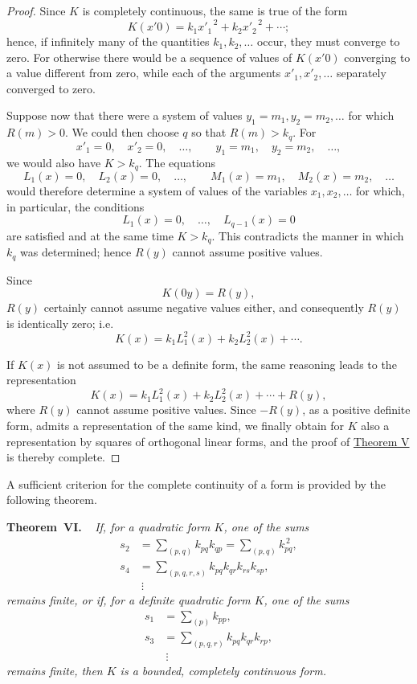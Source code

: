 \documentclass[b5paper,twoside]{article}
\makeatletter
\newcommand{\hilbertstatementname}[2]{%
  \textbf{#1\if\relax\detokenize{#2}\relax\else\ #2\fi.}%
}
\newenvironment{theorem}[1][]{%
  \par\addvspace{.7\baselineskip}%
  \phantomsection
  \protected@edef\@currentlabel{#1}%
  \noindent\hilbertstatementname{Theorem}{#1}\ \itshape\ignorespaces
}{%
  \par\addvspace{.7\baselineskip}%
}
\newcommand{\originalpage}[1]{\phantomsection\label{origpage:#1}}
\makeatother
\begin{document}
\begin{proof}
Since $K$ is completely continuous, the same is true of the form
\[
  K(x'0)=k_1{x'_1}^{\,2}+k_2{x'_2}^{\,2}+\cdots;
\]
hence, if infinitely many of the quantities $k_1,k_2,\ldots$ occur, they must
converge to zero.  For otherwise there would be a sequence of values of
$K(x'0)$ converging to a value different from zero, while each of the
arguments $x'_1,x'_2,\ldots$ separately converged to zero.

Suppose now that there were a system of values
$y_1=m_1,y_2=m_2,\ldots$ for which $R(m)>0$.  We could then choose $q$ so
that $R(m)>k_q$.  For
\[
  x'_1=0,\quad x'_2=0,\quad\ldots,
  \qquad y_1=m_1,\quad y_2=m_2,\quad\ldots,
\]
we would also have $K>k_q$.  The equations
\[
  L_1(x)=0,\quad L_2(x)=0,\quad\ldots,
  \qquad M_1(x)=m_1,\quad M_2(x)=m_2,\quad\ldots
\]
would therefore determine a system of values of the variables
$x_1,x_2,\ldots$\originalpage{203} for which, in particular, the conditions
\[
  L_1(x)=0,\quad\ldots,\quad L_{q-1}(x)=0
\]
are satisfied and at the same time $K>k_q$.  This contradicts the manner in
which $k_q$ was determined; hence $R(y)$ cannot assume positive values.

Since
\[
  K(0y)=R(y),
\]
$R(y)$ certainly cannot assume negative values either, and consequently
$R(y)$ is identically zero; i.e.
\[
  K(x)=k_1L_1^2(x)+k_2L_2^2(x)+\cdots.
\]

If $K(x)$ is not assumed to be a definite form, the same reasoning leads to
the representation
\[
  K(x)=k_1L_1^2(x)+k_2L_2^2(x)+\cdots+R(y),
\]
where $R(y)$ cannot assume positive values.  Since $-R(y)$, as a positive
definite form, admits a representation of the same kind, we finally obtain
for $K$ also a representation by squares of orthogonal linear forms, and the
proof of \hyperref[thm:V]{Theorem V} is thereby complete.
\end{proof}

A sufficient criterion for the complete continuity of a form is provided by
the following theorem.

\begin{theorem}[VI]\label{thm:VI}
If, for a quadratic form $K$, one of the sums
\[
\begin{aligned}
  s_2&=\sum_{(p,q)}k_{pq}k_{qp}
      =\sum_{(p,q)}k_{pq}^{\,2},\\
  s_4&=\sum_{(p,q,r,s)}k_{pq}k_{qr}k_{rs}k_{sp},\\
     &\ \vdots
\end{aligned}
\]
remains finite, or if, for a definite quadratic form $K$, one of the sums
\[
\begin{aligned}
  s_1&=\sum_{(p)}k_{pp},\\
  s_3&=\sum_{(p,q,r)}k_{pq}k_{qr}k_{rp},\\
     &\ \vdots
\end{aligned}
\]
remains finite, then $K$ is a bounded, completely continuous form.
\end{theorem}
\end{document}
